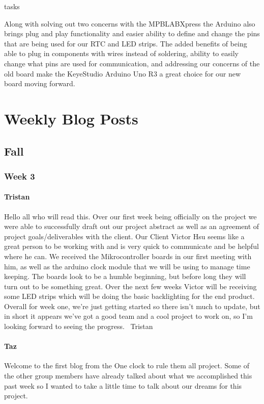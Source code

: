 tasks\documentclass[onecolumn, draftclsnofoot,10pt, compsoc]{IEEEtran}
\begin{document}
Along with solving out two concerns with the MPBLABXpress the Arduino also brings plug and play functionality and easier ability to define and change the pins that are being used for our RTC and LED strips.
The added benefits of being able to plug in components with wires instead of soldering, ability to easily change what pins are used for communication, and addressing our concerns of the old board make the KeyeStudio Arduino Uno R3 a great choice for our new board moving forward.

\section{Weekly Blog Posts}
\subsection{Fall}
\subsubsection{Week 3}
\paragraph{Tristan}
Hello all who will read this.
Over our first week being officially on the project we were able to successfully draft out our project abstract as well as an agreement of project goals/deliverables with the client. Our Client Victor Hsu seems like a great person to be working with and is very quick to communicate and be helpful where he can. We received the Mikrocontroller boards in our first meeting with him, as well as the arduino clock module that we will be using to manage time keeping. The boards look to be a humble beginning, but before long they will turn out to be something great. Over the next few weeks Victor will be receiving some LED strips which will be doing the basic backlighting for the end product.
Overall for week one, we're just getting started so there isn't much to update, but in short it appears we've got a good team and a cool project to work on, so I'm looking forward to seeing the progress.
~Tristan
\paragraph{Taz}
Welcome to the first blog from the One clock to rule them all project. Some of the other group members have already talked about what we accomplished this past week so I wanted to take a little time to talk about our dreams for this project.
\end{document}
